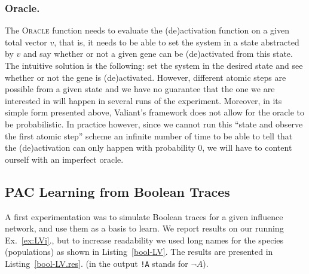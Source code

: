 \documentclass{llncs}
\begin{document}
\subsubsection{Oracle.}
The \textsc{Oracle} function needs to evaluate the (de)activation function on a given total vector $v$, that is, it needs to be able to set the system in a state abstracted by $v$ and say whether or not a given gene can be (de)activated from this state.
The intuitive solution is the following: set the system in the desired state and see whether or not the gene is (de)activated. 
However, different atomic steps are possible from a given state and we have no guarantee that the one we are interested in will happen
in several runs of the experiment. 
Moreover, in its simple form presented above, %
Valiant's framework does not allow for the oracle to be probabilistic.
In practice however, since we cannot run this ``state and observe the first atomic step'' scheme an infinite number of time to be able to tell that the (de)activation can only happen with probability 0,
we will have to content ourself with an imperfect oracle.


\subsection{PAC Learning from Boolean Traces}

A first experimentation was to simulate Boolean traces for a given influence network, and use them as a basis to learn.
We report results on our running
Ex.~\ref{ex:LVi}., but to increase readability we used long names for the
species (populations) as shown in Listing~\ref{bool-LV}.
The results are presented in Listing~\ref{bool-LV.res}.
(in the output \texttt{!A} stands for $\neg A$).

\end{document}
